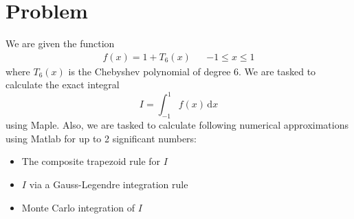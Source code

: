 \documentclass[11pt, a4paper, titlepage, openright]{article}
\begin{document}

\tableofcontents
\newpage

\section{Problem}
    We are given the function
        \[
            \begin{aligned}
                f(x) = 1 + T_6(x)    && -1 \le x \le 1
            \end{aligned}
        \]
    where \(T_6(x)\) is the Chebyshev polynomial of degree 6.
    We are tasked to calculate the exact integral \[ I = \int_{-1}^1 \! f(x) \, \mathrm{d}x \] using Maple.
    Also, we are tasked to calculate following numerical approximations using Matlab for up to 2 significant numbers:
    \begin{itemize}
        \item The composite trapezoid rule for \( I \)
        \item \( I \) via a Gauss-Legendre integration rule
        \item Monte Carlo integration of  \( I \)
    \end{itemize}
\end{document}
